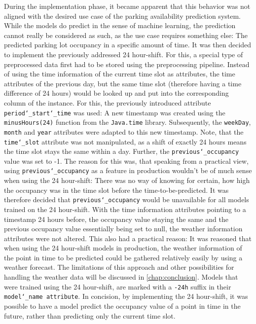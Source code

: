 During the implementation phase, it became apparent that this behavior was not aligned with the desired use case of the parking availability prediction system. While the models do predict in the sense of machine learning, the prediction cannot really be considered as such, as the use case requires something else: The predicted parking lot occupancy in a specific amount of time. It was then decided to implement the previously addressed 24 hour-shift. For this, a special type of preprocessed data first had to be stored using the preprocessing pipeline. Instead of using the time information of the current time slot as attributes, the time attributes of the previous day, but the same time slot (therefore having a time difference of 24 hours) would be looked up and put into the corresponding column of the instance. For this, the previously introduced attribute \texttt{period\char`_start\char`_time} was used: A new timestamp was created using the \texttt{minusHours(24)} function from the \texttt{Java.time} library. Subsequently, the \texttt{weekDay}, \texttt{month} and \texttt{year} attributes were adapted to this new timestamp. Note, that the \texttt{time\char`_slot} attribute was not manipulated, as a shift of exactly 24 hours means the time slot stays the same within a day. Further, the \texttt{previous\char`_occupancy} value was set to -1. The reason for this was, that speaking from a practical view, using \texttt{previous\char`_occupancy} as a feature in production wouldn’t be of much sense when using the 24 hour-shift: There was no way of knowing for certain, how high the occupancy was in the time slot before the time-to-be-predicted. It was therefore decided that \texttt{previous\char`_occupancy} would be unavailable for all models trained on the 24 hour-shift. With the time information attributes pointing to a timestamp 24 hours before, the occupancy value staying the same and the previous occupancy value essentially being set to null, the weather information attributes were not altered. This also had a practical reason: It was reasoned that when using the 24 hour-shift models in production, the weather information of the point in time to be predicted could be gathered relatively easily by using a weather forecast. The limitations of this approach and other possibilities for handling the weather data will be discussed in \autoref{chap:conclusion}. Models that were trained using the 24 hour-shift, are marked with a \texttt{-24h} suffix in their \texttt{model\char`_name attribute}. In concision, by implementing the 24 hour-shift, it was possible to have a model predict the occupancy value of a point in time in the future, rather than predicting only the current time slot.
 
